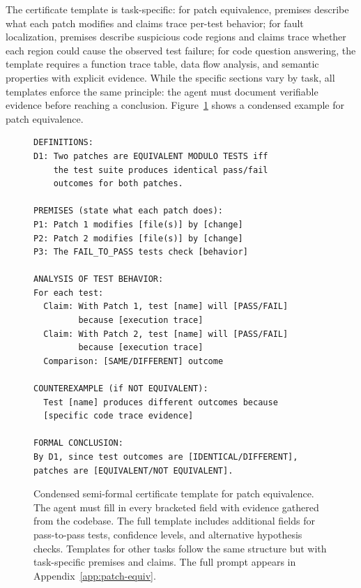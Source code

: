 \documentclass[]{meta}
\begin{document}
The certificate template is task-specific: for patch equivalence, premises describe what each patch modifies and claims trace per-test behavior; for fault localization, premises describe suspicious code regions and claims trace whether each region could cause the observed test failure; for code question answering, the template requires a function trace table, data flow analysis, and semantic properties with explicit evidence. While the specific sections vary by task, all templates enforce the same principle: the agent must document verifiable evidence before reaching a conclusion. Figure~\ref{fig:certificate-template} shows a condensed example for patch equivalence.

\begin{figure}[t]
\centering
\begin{tcolorbox}[
  colback=white,
  colframe=black!60,
  width=\linewidth,
  boxrule=0.5pt,
  arc=2pt,
  title={\textbf{Semi-formal Certificate Template} (patch equivalence)},
  fonttitle=\small,
  coltitle=black,
  colbacktitle=gray!15
]
\small
\begin{verbatim}
DEFINITIONS:
D1: Two patches are EQUIVALENT MODULO TESTS iff
    the test suite produces identical pass/fail
    outcomes for both patches.

PREMISES (state what each patch does):
P1: Patch 1 modifies [file(s)] by [change]
P2: Patch 2 modifies [file(s)] by [change]
P3: The FAIL_TO_PASS tests check [behavior]

ANALYSIS OF TEST BEHAVIOR:
For each test:
  Claim: With Patch 1, test [name] will [PASS/FAIL]
         because [execution trace]
  Claim: With Patch 2, test [name] will [PASS/FAIL]
         because [execution trace]
  Comparison: [SAME/DIFFERENT] outcome

COUNTEREXAMPLE (if NOT EQUIVALENT):
  Test [name] produces different outcomes because
  [specific code trace evidence]

FORMAL CONCLUSION:
By D1, since test outcomes are [IDENTICAL/DIFFERENT],
patches are [EQUIVALENT/NOT EQUIVALENT].
\end{verbatim}
\end{tcolorbox}
\caption{Condensed semi-formal certificate template for patch equivalence. The agent must fill in every bracketed field with evidence gathered from the codebase. The full template includes additional fields for pass-to-pass tests, confidence levels, and alternative hypothesis checks. Templates for other tasks follow the same structure but with task-specific premises and claims. The full prompt appears in Appendix~\ref{app:patch-equiv}.}
\label{fig:certificate-template}
\end{figure}
\end{document}
